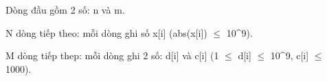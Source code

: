 Dòng đầu gồm 2 số: n và m.

N dòng tiếp theo: mỗi dòng ghi số x[i] (abs(x[i])  $\le$  10^9).

M dòng tiếp thep: mỗi dòng ghi 2 số: d[i] và c[i] (1  $\le$  d[i]  $\le$  10^9, c[i]  $\le$  1000).

\